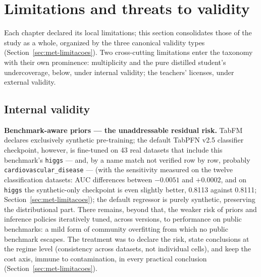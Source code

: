 \section{Limitations and threats to validity}
\label{sec:conc-limitacoes}

Each chapter declared its local limitations; this section
consolidates those of the study as a whole, organized by the three
canonical validity types (Section~\ref{sec:met-limitacoes}). Two
cross-cutting limitations enter the taxonomy with their own
prominence: multiplicity and the pure distilled student's
undercoverage, below, under internal validity; the teachers'
licenses, under external validity.

\subsection{Internal validity}

\textbf{Benchmark-aware priors --- the unaddressable residual
risk.} TabFM declares exclusively synthetic pre-training; the
default TabPFN v2.5 classifier checkpoint, however, is fine-tuned
on 43 real datasets that include this benchmark's \texttt{higgs}
--- and, by a name match not verified row by row, probably
\texttt{cardiovascular\_disease} --- (with the sensitivity measured
on the twelve classification datasets: AUC differences between
$-0.0051$ and $+0.0002$, and on \texttt{higgs} the synthetic-only
checkpoint is even slightly better, 0.8113 against 0.8111;
Section~\ref{sec:met-limitacoes}); the default regressor is purely
synthetic, preserving the distributional part. There remains,
beyond that, the weaker risk of priors and inference policies
iteratively tuned, across versions, to performance on public
benchmarks: a mild form of community overfitting from which no
public benchmark escapes. The treatment was to declare the risk,
state conclusions at the regime level (consistency across datasets,
not individual cells), and keep the cost axis, immune to
contamination, in every practical conclusion
(Section~\ref{sec:met-limitacoes}).

